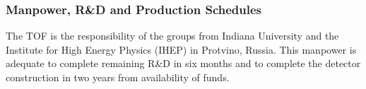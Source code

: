 \subsubsection*{Manpower, R\&D and Production Schedules}

The TOF is the responsibility of the groups from Indiana University and the Institute for
High Energy Physics (IHEP) in Protvino, Russia.  This manpower is adequate to complete
remaining R\&D in six months and to complete the detector construction in
two years from availability of funds.

